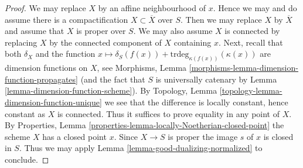 \documentclass[10pt,a4paper]{amsart}
\theoremstyle{plain}
\theoremstyle{definition}
\theoremstyle{remark}
\numberwithin{equation}{subsection}
\begin{document}
\begin{proof}
We may replace $X$ by an affine neighbourhood of $x$. Hence we may
and do assume there is a compactification $X \subset \overline{X}$
over $S$. Then we may replace $X$ by $\overline{X}$ and assume
that $X$ is proper over $S$. We may also assume $X$ is connected
by replacing $X$ by the connected component of $X$ containing $x$.
Next, recall that both $\delta_X$ and the function
$x \mapsto \delta_S(f(x)) + \text{trdeg}_{\kappa(f(x))}(\kappa(x))$
are dimension functions on $X$, see
Morphisms, Lemma \ref{morphisms-lemma-dimension-function-propagates}
(and the fact that $S$ is universally catenary by
Lemma \ref{lemma-dimension-function-scheme}).
By Topology, Lemma \ref{topology-lemma-dimension-function-unique}
we see that the difference is locally constant, hence constant as $X$ is
connected. Thus it suffices to prove equality in any point of $X$.
By Properties, Lemma \ref{properties-lemma-locally-Noetherian-closed-point}
the scheme $X$ has a closed point $x$. Since $X \to S$ is proper
the image $s$ of $x$ is closed in $S$. Thus we may apply
Lemma \ref{lemma-good-dualizing-normalized} to conclude.
\end{proof}
\end{document}
